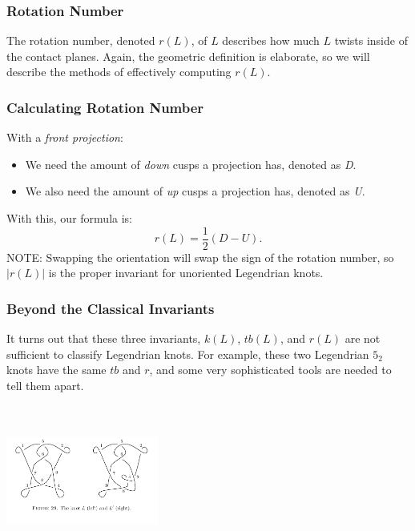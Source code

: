 \documentclass{beamer}
\begin{document}
\begin{frame}
    \frametitle{Rotation Number}
    The \alert{rotation number}, denoted \alert{$r(L)$}, of $L$ describes how
    much $L$ twists inside of the contact planes.
    Again, the geometric definition is elaborate, so we will describe the
    methods of effectively computing $r(L)$.
\end{frame}


\begin{frame}
    \frametitle{Calculating Rotation Number}
    With a \textit{front projection}:
    \begin{itemize}
        \item{We need the amount of \textit{down} cusps a projection has, denoted
        as \textit{D}.}
      \item{We also need the amount of \textit{up} cusps a projection has,
      denoted as \textit{U}.}
    \end{itemize}
    With this, our formula is:
    \[r(L) = \frac{1}{2}(D - U).\]
    \alert{NOTE}: Swapping the orientation will swap the sign of the rotation number,
    so $|r(L)|$ is the proper invariant for unoriented Legendrian knots.
\end{frame}

\begin{frame}
    \frametitle{Beyond the Classical Invariants}
    It turns out that these three invariants, $k(L)$, $tb(L)$, and $r(L)$
    are not sufficient to classify Legendrian knots. For example, these
    two Legendrian $5_2$ knots have the same $tb$ and $r$, and some very
    sophisticated tools are needed to tell them apart.

    
\begin{center}
    \includegraphics[height=5cm,width=5cm]{diffKnots.jpg}
\end{center}

\end{frame}


     
    
\end{document}
